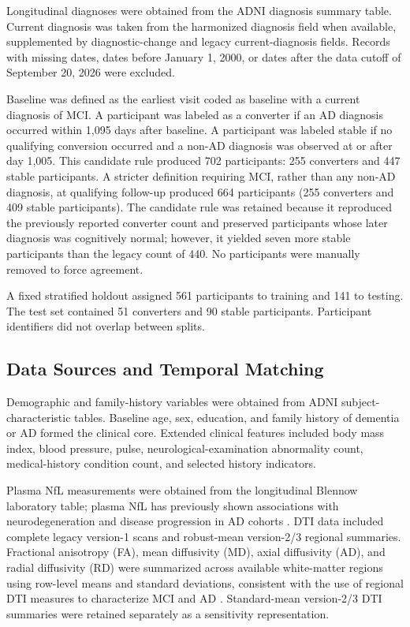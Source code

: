 \documentclass[preprint,12pt]{elsarticle}
\begin{document}
Longitudinal diagnoses were obtained from the ADNI diagnosis summary table. Current diagnosis was taken from the harmonized diagnosis field when available, supplemented by diagnostic-change and legacy current-diagnosis fields. Records with missing dates, dates before January 1, 2000, or dates after the data cutoff of September 20, 2026 were excluded.

Baseline was defined as the earliest visit coded as baseline with a current diagnosis of MCI. A participant was labeled as a converter if an AD diagnosis occurred within 1,095 days after baseline. A participant was labeled stable if no qualifying conversion occurred and a non-AD diagnosis was observed at or after day 1,005. This candidate rule produced 702 participants: 255 converters and 447 stable participants. A stricter definition requiring MCI, rather than any non-AD diagnosis, at qualifying follow-up produced 664 participants (255 converters and 409 stable participants). The candidate rule was retained because it reproduced the previously reported converter count and preserved participants whose later diagnosis was cognitively normal; however, it yielded seven more stable participants than the legacy count of 440. No participants were manually removed to force agreement.

A fixed stratified holdout assigned 561 participants to training and 141 to testing. The test set contained 51 converters and 90 stable participants. Participant identifiers did not overlap between splits.

\subsection{Data Sources and Temporal Matching}
\label{subsec:data_preparation}

Demographic and family-history variables were obtained from ADNI subject-characteristic tables. Baseline age, sex, education, and family history of dementia or AD formed the clinical core. Extended clinical features included body mass index, blood pressure, pulse, neurological-examination abnormality count, medical-history condition count, and selected history indicators.

Plasma NfL measurements were obtained from the longitudinal Blennow laboratory table; plasma NfL has previously shown associations with neurodegeneration and disease progression in AD cohorts \cite{mattssonAssociationPlasmaNeurofilament2017,lewczukPlasmaNeurofilamentLight2018}. DTI data included complete legacy version-1 scans and robust-mean version-2/3 regional summaries. Fractional anisotropy (FA), mean diffusivity (MD), axial diffusivity (AD), and radial diffusivity (RD) were summarized across available white-matter regions using row-level means and standard deviations, consistent with the use of regional DTI measures to characterize MCI and AD \cite{mielkeRegionallySpecificDiffusion2009,douaudDTIMeasuresMild2011,nirEffectivenessRegionalDTI2013}. Standard-mean version-2/3 DTI summaries were retained separately as a sensitivity representation.
\end{document}
